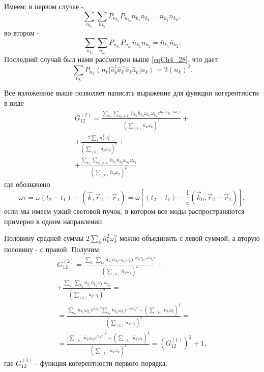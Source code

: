 Имеем: в первом случае -
\begin{equation}
\sum_{n_{k_1}}\sum_{n_{k_2}} P_{n_{k_1}} P_{n_{k_2}} 
n_{k_1} n_{k_2} = \bar{n}_{k_1} \bar{n}_{k_2},
\label{eqCh4_34}
\end{equation}
во втором -
\begin{equation}
\sum_{n_{k_1}}\sum_{n_{k_2}} P_{n_{k_1}} P_{n_{k_2}} 
n_{k_1} n_{k_2} = \bar{n}_{k_1} \bar{n}_{k_2}.
\label{eqCh4_35}
\end{equation}
Последний случай был нами рассмотрен выше \eqref{eqCh4_28}, что дает
\begin{equation}
\sum_{n_{k}} P_{n_{k}}
\left<n_k\right|\hat{a}_k^{\dag}\hat{a}_k^{+}\hat{a}_k\hat{a}_k\left|n_k\right>
= 2 \left(\bar{n}_k\right)^2.
\label{eqCh4_36}
\end{equation}

Все изложенное выше позволяет написать выражение для функции
когерентности в виде 
\begin{eqnarray}
G_{12}^{(2)} = \frac{\sum_{k_1}\sum_{k_2 \neq k_1} \bar{n}_{k_1}
  \bar{n}_{k_2} \omega_{k_1} \omega_{k_2} e^{i \omega_{k_1} \tau} 
e^{- i \omega_{k_2} \tau} } 
{\left(\sum_{(k)} \bar{n}_k \omega_k\right)^2} + 
\nonumber \\
+
\frac{2 \sum_{k} \bar{n}_{k}^2 \omega_k^2} 
{\left(\sum_{(k)} \bar{n}_k \omega_k\right)^2} + 
\nonumber \\
+
\frac{\sum_{k_1}\sum_{k_2 \neq k_1} \bar{n}_{k_1}
  \bar{n}_{k_2} \omega_{k_1} \omega_{k_2}} 
{\left(\sum_{(k)} \bar{n}_k \omega_k\right)^2}
\label{eqCh4_37}
\end{eqnarray}
где обозначено 
\[
\omega \tau = \omega \left(t_2 - t_1\right) - \left(\vec{k}, \vec{r}_2
- \vec{r}_1\right) = 
\omega \left[
\left(t_2 - t_1\right) - \frac{1}{c}\left(\vec{k}_0, \vec{r}_2
- \vec{r}_1\right)
\right],
\]
если мы имеем узкий световой пучок, в котором все моды
распространяются примерно в одном направлении. 

Половину средней суммы $2 \sum_{k} \bar{n}_{k}^2 \omega_k^2$ можно
объединить с левой суммой, а вторую половину - с правой. Получим: 
\begin{eqnarray}
G_{12}^{(2)} = \frac{\sum_{k_1}\sum_{k_2} \bar{n}_{k_1}
  \bar{n}_{k_2} \omega_{k_1} \omega_{k_2} e^{i \omega_{k_1} \tau} 
e^{- i \omega_{k_2} \tau}} 
{\left(\sum_{(k)} \bar{n}_k \omega_k\right)^2} + 
\nonumber \\
+ \frac{\sum_{k_1}\sum_{k_2} \bar{n}_{k_1}
  \bar{n}_{k_2} \omega_{k_1} \omega_{k_2}} 
{\left(\sum_{(k)} \bar{n}_k \omega_k\right)^2} = 
\nonumber \\
= 
\frac{\sum_{k_1}\bar{n}_{k_1} \omega_{k_1} e^{i \omega_{k_1} \tau}
\sum_{k_2}\bar{n}_{k_2} \omega_{k_2} e^{- i \omega_{k_2} \tau} +
\left(\sum_{(k)} \bar{n}_k \omega_k\right)^2
}
{\left(\sum_{(k)} \bar{n}_k \omega_k\right)^2} = 
\nonumber \\
= \frac{\left|\sum_{(k)}\bar{n}_{k} \omega_{k} e^{i \omega_{k}
  \tau}\right|^2 + \left(\sum_{(k)} \bar{n}_k \omega_k\right)^2}
{\left(\sum_{(k)} \bar{n}_k \omega_k\right)^2} = 
\left(G_{12}^{(1)}\right)^2 + 1,
\label{eqCh4_38}
\end{eqnarray}
где $G_{12}^{(1)}$ - функция когерентности
первого порядка.  

